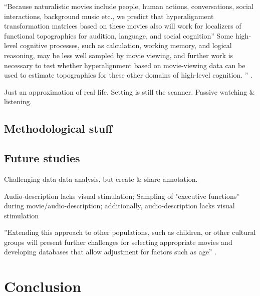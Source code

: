 %
``Because naturalistic movies include people, human actions, conversations,
social interactions, background music etc., we predict that hyperalignment
transformation matrices based on these movies also will work for localizers of
functional topographies for audition, language, and social cognition''
\citep{jiahui2020predicting}
%
Some high-level cognitive processes, such as calculation, working memory, and
logical reasoning, may be less well sampled by movie viewing, and further work
is necessary to test whether hyperalignment based on movie-viewing data can be
used to estimate topographies for these other domains of high-level cognition.
'' \citep{jiahui2020predicting}.


%
Just an approximation of real life.
%
Setting is still the scanner.
%
Passive watching \& listening.



\subsection{Methodological stuff}




\subsection{Future studies}
%
Challenging data data analysis, but create \& share annotation.

%
Audio-description lacks visual stimulation; Sampling of "executive functions"
during movie/audio-description;
%
additionally, audio-description lacks visual stimulation

%
''Extending this approach to other populations, such as children, or other
cultural groups will present further challenges for selecting appropriate movies
and developing databases that allow adjustment for factors such as age''
\citep{jiahui2020predicting}.




\section{Conclusion}

